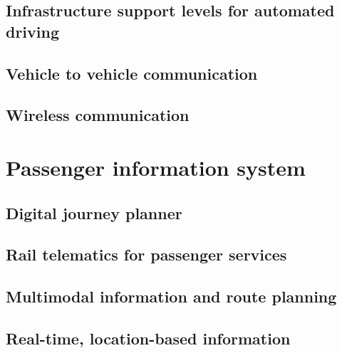 \documentclass[
]{book}
\begin{document}
\hypertarget{infrastructure-support-levels-for-automated-driving}{%
\section{Infrastructure support levels for automated driving}\label{infrastructure-support-levels-for-automated-driving}}

\hypertarget{vehicle-to-vehicle-communication}{%
\section{Vehicle to vehicle communication}\label{vehicle-to-vehicle-communication}}

\hypertarget{wireless-communication}{%
\section{Wireless communication}\label{wireless-communication}}

\hypertarget{passenger}{%
\chapter{Passenger information system}\label{passenger}}

\hypertarget{digital-journey-planner}{%
\section{Digital journey planner}\label{digital-journey-planner}}

\hypertarget{rail-telematics-for-passenger-services}{%
\section{Rail telematics for passenger services}\label{rail-telematics-for-passenger-services}}

\hypertarget{multimodal-information-and-route-planning}{%
\section{Multimodal information and route planning}\label{multimodal-information-and-route-planning}}

\hypertarget{real-time-location-based-information}{%
\section{Real-time, location-based information}\label{real-time-location-based-information}}
\end{document}
